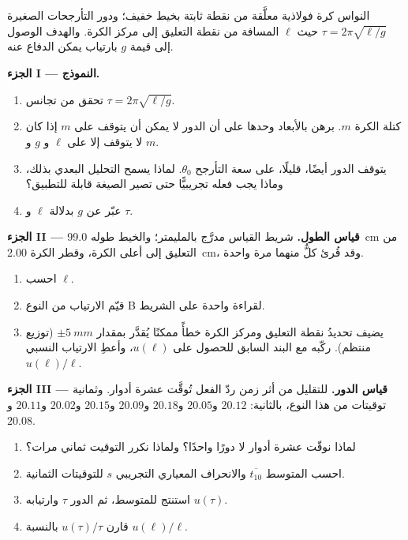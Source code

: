 \begin{problem}
\label{pb:b1:units-dimensions:1}
النواس كرة فولاذية معلَّقة من نقطة ثابتة بخيط خفيف؛ ودور التأرجحات
الصغيرة $\tau = 2\pi\sqrt{\ell/g}$ حيث $\ell$ المسافة من نقطة
التعليق إلى مركز الكرة. والهدف الوصول إلى قيمة $g$ بارتياب يمكن الدفاع عنه.

\medskip
\noindent\textbf{الجزء I --- النموذج.}
\begin{enumerate}
  \item تحقق من تجانس $\tau = 2\pi\sqrt{\ell/g}$.
  \item كتلة الكرة $m$. برهن بالأبعاد وحدها على أن الدور لا يمكن أن
        يتوقف على $m$ إذا كان لا يتوقف إلا على $\ell$ و $g$ و $m$.
  \item يتوقف الدور أيضًا، قليلًا، على سعة التأرجح $\theta_0$.
        لماذا يسمح التحليل البعدي بذلك، وماذا يجب فعله تجريبيًّا حتى
        تصير الصيغة قابلة للتطبيق؟
  \item عبّر عن $g$ بدلالة $\ell$ و $\tau$.
\end{enumerate}

\medskip
\noindent\textbf{الجزء II --- قياس الطول.}
شريط القياس مدرَّج بالمليمتر؛ والخيط طوله \qty{99.0}{cm} من التعليق
إلى أعلى الكرة، وقطر الكرة \qty{2.00}{cm}، وقد قُرئ كلٌّ منهما مرة
واحدة.
\begin{enumerate}[resume]
  \item احسب $\ell$.
  \item قيّم الارتياب من النوع B لقراءة واحدة على الشريط.
  \item يضيف تحديدُ نقطة التعليق ومركز الكرة خطأً ممكنًا يُقدَّر
        بمقدار $\pm\qty{5}{mm}$ (توزيع منتظم). ركّبه مع البند
        السابق للحصول على $u(\ell)$، وأعطِ الارتياب النسبي
        $u(\ell)/\ell$.
\end{enumerate}

\medskip
\noindent\textbf{الجزء III --- قياس الدور.}
للتقليل من أثر زمن ردّ الفعل تُوقَّت عشرة أدوار. وثمانية توقيتات من
هذا النوع، بالثانية: $20.12$ و$20.05$ و$20.18$ و$20.09$ و$20.15$
و$20.02$ و$20.11$ و$20.08$.
\begin{enumerate}[resume]
  \item لماذا نوقّت عشرة أدوار لا دورًا واحدًا؟ ولماذا نكرر التوقيت
        ثماني مرات؟
  \item احسب المتوسط $\overline{t_{10}}$ والانحراف المعياري
        التجريبي $s$ للتوقيتات الثمانية.
  \item استنتج  للمتوسط، ثم الدور $\tau$
        وارتيابه $u(\tau)$.
  \item قارن $u(\tau)/\tau$ بالنسبة $u(\ell)/\ell$.
\end{enumerate}


\end{problem}
